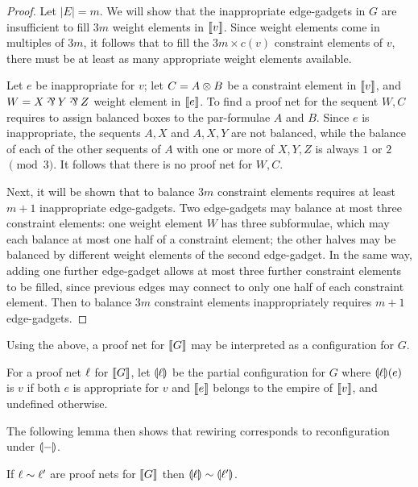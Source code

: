 \documentclass{lmcs}
\begin{document}
\begin{proof}
%
Let $|E|=m$.
%
We will show that the inappropriate edge-gadgets in $G$ are insufficient to fill $3m$ weight elements in $\llbracket v\rrbracket$.
%
Since weight elements come in multiples of $3m$, it follows that to fill the $3m\times c(v)$ constraint elements of $v$, there must be at least as many appropriate weight elements available.



Let $e$ be inappropriate for $v$; let $C=A\otimes B$ be a constraint element in $\llbracket v\rrbracket$, and $W=X\pr Y\pr Z$ weight element  in $\llbracket e\rrbracket$.
%
To find a proof net for the sequent $W,C$ requires to assign balanced boxes to the par-formulae $A$ and $B$.
%
Since $e$ is inappropriate, the sequents $A,X$ and $A,X,Y$ are not balanced, while the balance of each of the other sequents of $A$ with one or more of $X,Y,Z$ is always $1$ or $2$ $\pmod 3$.
%
It follows that there is no proof net for $W,C$.


Next, it will be shown that to balance $3m$ constraint elements requires at least $m+1$ inappropriate edge-gadgets.
%
Two edge-gadgets may balance at most three constraint elements: one weight element $W$ has three subformulae, which may each balance at most one half of a constraint element; the other halves may be balanced by different weight elements of the second edge-gadget.
%
In the same way, adding one further edge-gadget allows at most three further constraint elements to be filled, since previous edges may connect to only one half of each constraint element.
%
Then to balance $3m$ constraint elements inappropriately requires $m+1$ edge-gadgets.
%
\end{proof}



Using the above, a proof net for $\llbracket G\rrbracket$ may be interpreted as a configuration for $G$.



\begin{definition}
For a proof net $\ell$ for $\llbracket G\rrbracket$, let $\llparenthesis\ell\rrparenthesis$ be the partial configuration for $G$ where $\llparenthesis\ell\rrparenthesis(e)$ is $v$ if both $e$ is appropriate for $v$ and $\llbracket e\rrbracket$ belongs to the empire of $\llbracket v\rrbracket$, and  undefined otherwise.
\end{definition}


The following lemma then shows that rewiring corresponds to reconfiguration under $\llparenthesis-\rrparenthesis$.



\begin{lemma}
\label{lem:soundness}
If $\links\perm\links'$ are proof nets for $\llbracket G\rrbracket$ then $\coitn\links\perm\coitn{\links'}$.
\end{lemma}
\end{document}
